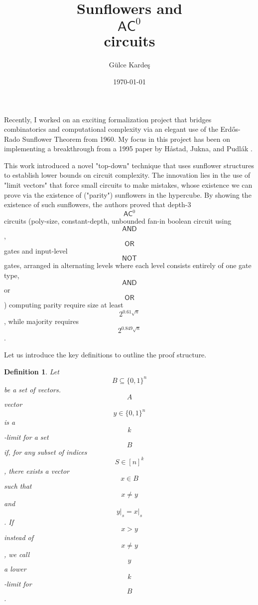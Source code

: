 \documentclass[a4, 12pt]{article}
\title{Sunflowers and $$\mathsf{AC}^0$$ circuits}
\author{Gülce Kardeş
}
\date{\today}
\newtheorem{definition}{Definition}
\begin{document}
\maketitle
Recently, I worked on an exciting formalization project that bridges combinatorics and computational complexity via an elegant use of the Erdős-Rado Sunflower Theorem from 1960.
My focus in this project has been on implementing a breakthrough from a 1995 paper by Håstad, Jukna, and Pudlák \cite{Hstad1995}.

This work introduced a novel "top-down" technique that uses sunflower structures to establish lower bounds on circuit complexity. The innovation lies in the use of "limit vectors" that force small circuits to make mistakes, whose existence we can prove via the existence of ("parity") sunflowers in the hypercube. By showing the existence of such sunflowers, the authors proved that depth-3 $$\mathsf{AC}^0$$ circuits (poly-size, constant-depth, unbounded fan-in boolean circuit using $$\mathsf{AND}$$, $$\mathsf{OR}$$ gates and input-level $$\mathsf{NOT}$$ gates, arranged in alternating levels where each level consists entirely of one gate type, $$\mathsf{AND}$$ or $$\mathsf{OR}$$) computing parity require size at least $$2^{0.61\sqrt{n}}$$, while majority requires $$2^{0.849\sqrt{n}}$$. 

Let us introduce the key definitions to outline the proof structure.
\begin{definition}
Let $$B \subseteq\{0,1\}^n$$ be a set of vectors. $$A$$ vector $$y \in\{0,1\}^n$$ is a $$k$$-limit for a set $$B$$ if, for any subset of indices $$S \in[n]^k$$, there exists a vector $$x \in B$$ such that $$x \neq y$$ and $$\left.y\right|_s=\left.x\right|_s$$. If $$x>y$$ instead of $$x \neq y$$, we call $$y$$ a lower $$k$$-limit for $$B$$.  
\end{definition} 
\end{document}
